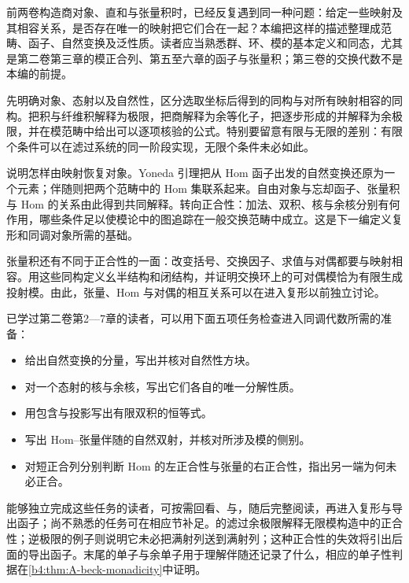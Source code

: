 
\BookPartGuide
前两卷构造商对象、直和与张量积时，已经反复遇到同一种问题：给定一些映射及其相容关系，是否存在唯一的映射把它们合在一起？本编把这样的描述整理成范畴、函子、自然变换及泛性质。读者应当熟悉群、环、模的基本定义和同态，尤其是第二卷第三章的模正合列、第五至六章的函子与张量积；第三卷的交换代数不是本编的前提。

\ProseParagraphBreak
{}先明确对象、态射以及自然性，区分选取坐标后得到的同构与对所有映射相容的同构。把积与纤维积解释为极限，把商解释为余等化子，把逐步形成的并解释为余极限，并在模范畴中给出可以逐项核验的公式。特别要留意有限与无限的差别：有限个条件可以在滤过系统的同一阶段实现，无限个条件未必如此。

\ProseParagraphBreak
{}说明怎样由映射恢复对象。Yoneda 引理把从 Hom 函子出发的自然变换还原为一个元素；伴随则把两个范畴中的 Hom 集联系起来。自由对象与忘却函子、张量积与 Hom 的关系由此得到共同解释。转向正合性：加法、双积、核与余核分别有何作用，哪些条件足以使模论中的图追踪在一般交换范畴中成立。这是下一编定义复形和同调对象所需的基础。

\ProseParagraphBreak
张量积还有不同于正合性的一面：改变括号、交换因子、求值与对偶都要与映射相容。用这些同构定义幺半结构和闭结构，并证明交换环上的可对偶模恰为有限生成投射模。由此，张量、Hom 与对偶的相互关系可以在进入复形以前独立讨论。

\ProseParagraphBreak
已学过第二卷第2—7章的读者，可以用下面五项任务检查进入同调代数所需的准备：
\begin{itemize}
	\item 给出自然变换的分量，写出并核对自然性方块。
	\item 对一个态射的核与余核，写出它们各自的唯一分解性质。
	\item 用包含与投影写出有限双积的恒等式。
	\item 写出 Hom--张量伴随的自然双射，并核对所涉及模的侧别。
	\item 对短正合列分别判断 Hom 的左正合性与张量的右正合性，指出另一端为何未必正合。
\end{itemize}
能够独立完成这些任务的读者，可按需回看、与，随后完整阅读，再进入复形与导出函子；尚不熟悉的任务可在相应节补足。的滤过余极限解释无限模构造中的正合性；逆极限的例子则说明它未必把满射列送到满射列；这种正合性的失效将引出后面的导出函子。末尾的单子与余单子用于理解伴随还记录了什么，相应的单子性判据在\cref{b4:thm:A-beck-monadicity}中证明。

